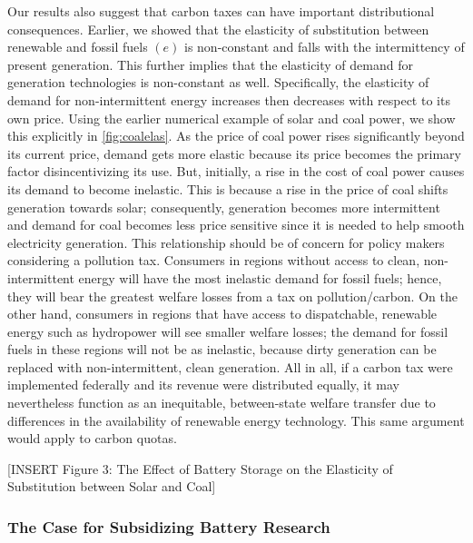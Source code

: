 \documentclass[11pt,a4paper,leqno]{extarticle}
\begin{document}
	Our results also suggest that carbon taxes can have important distributional consequences. Earlier, we showed that the elasticity of substitution between renewable and fossil fuels $(e)$ is non-constant and falls with the intermittency of present generation. This further implies that the elasticity of demand for generation technologies is non-constant as well. Specifically, the elasticity of demand for non-intermittent energy increases then decreases with respect to its own price. Using the earlier numerical example of solar and coal power, we show this explicitly in \autoref{fig:coalelas}. As the price of coal power rises significantly beyond its current price, demand gets more elastic because its price becomes the primary factor disincentivizing its use. But, initially, a rise in the cost of coal power causes its demand to become inelastic. This is because a rise in the price of coal shifts generation towards solar;  consequently, generation becomes more intermittent and demand for coal becomes less price sensitive since it is needed to help smooth electricity generation. This relationship should be of concern for policy makers considering a pollution tax. Consumers in regions without access to clean, non-intermittent energy will have the most inelastic demand for fossil fuels; hence, they will bear the greatest welfare losses from a tax on pollution/carbon. On the other hand, consumers in regions that have access to dispatchable, renewable energy such as hydropower will see smaller welfare losses; the demand for fossil fuels in these regions will not be as inelastic, because dirty generation can be replaced with non-intermittent, clean generation. All in all, if a carbon tax were implemented federally and its revenue were distributed equally, it may nevertheless function as an inequitable, between-state welfare transfer due to differences in the availability of renewable energy technology. This same argument would apply  to carbon quotas.
	
	
	\vspace{0.15in}
	\begin{center}
		[INSERT Figure 3: The Effect of Battery Storage on the Elasticity of Substitution between Solar and Coal]
	\end{center}
	\vspace{0.15in}
	
	
	
	\subsubsection{The Case for Subsidizing Battery Research}
	
\end{document}
